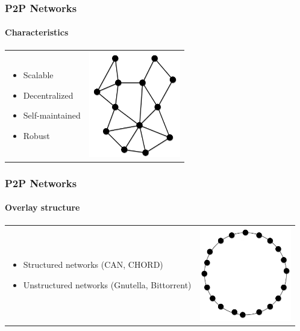\begin{frame}
\frametitle{P2P Networks}
\framesubtitle{Characteristics}
\begin{table}
\begin{tabular}{p{7cm}p{3cm}}
\begin{itemize}
  \item Scalable
  \item Decentralized
  \item Self-maintained
  \item Robust
\end{itemize}
&
\vspace{1.5cm}
\includegraphics[width=4cm]{img/p2p-unstructured}\\
\end{tabular}
\end{table}
\end{frame}

\begin{frame}
\frametitle{P2P Networks}
\framesubtitle{Overlay structure}
\begin{table}
\begin{tabular}{p{7cm}p{3cm}}
\begin{itemize}
    \item Structured networks (CAN, CHORD)
    \item Unstructured networks (Gnutella, Bittorrent)
\end{itemize}
&
\vspace{1.5cm}
\includegraphics[width=4cm]{img/p2p-structured}\\
\end{tabular}
\end{table}
\end{frame}

